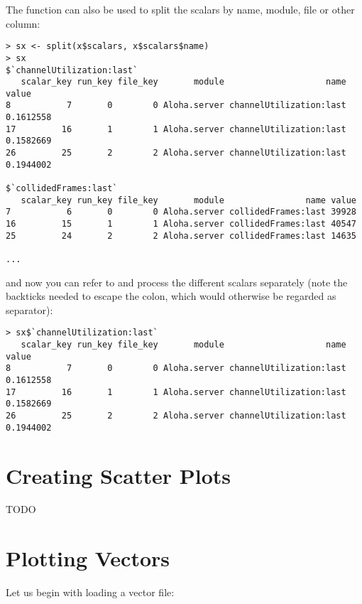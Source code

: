 The  function can also be used to split the scalars by name, module, file
or other column:

\begin{verbatim}
> sx <- split(x$scalars, x$scalars$name)
> sx
$`channelUtilization:last`
   scalar_key run_key file_key       module                    name     value
8           7       0        0 Aloha.server channelUtilization:last 0.1612558
17         16       1        1 Aloha.server channelUtilization:last 0.1582669
26         25       2        2 Aloha.server channelUtilization:last 0.1944002

$`collidedFrames:last`
   scalar_key run_key file_key       module                name value
7           6       0        0 Aloha.server collidedFrames:last 39928
16         15       1        1 Aloha.server collidedFrames:last 40547
25         24       2        2 Aloha.server collidedFrames:last 14635

...
\end{verbatim}

and now you can refer to and process the different scalars separately (note the
backticks needed to escape the colon, which would otherwise be regarded as separator):

\begin{verbatim}
> sx$`channelUtilization:last`
   scalar_key run_key file_key       module                    name     value
8           7       0        0 Aloha.server channelUtilization:last 0.1612558
17         16       1        1 Aloha.server channelUtilization:last 0.1582669
26         25       2        2 Aloha.server channelUtilization:last 0.1944002
\end{verbatim}


\section{Creating Scatter Plots}

TODO


\section{Plotting Vectors}

Let us begin with loading a vector file:

